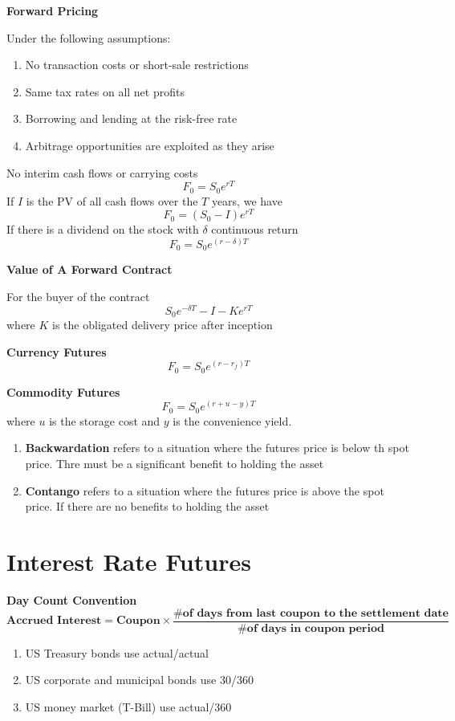 \documentclass[11pt,fleqn]{book} %
\numberwithin{equation}{section} %
\numberwithin{figure}{section} %
\numberwithin{table}{section} %
\begin{document}
\begin{theorem}\textbf{Forward Pricing}

Under the following assumptions:
\begin{enumerate}
    \item No transaction costs or short-sale restrictions
    \item Same tax rates on all net profits
    \item Borrowing and lending at the risk-free rate
    \item Arbitrage opportunities are exploited as they arise
\end{enumerate}
No interim cash flows or carrying costs
$$
F_0=S_0e^{rT}
$$
If $I$ is the PV of all cash flows over the $T$ years, we have
$$
F_0=(S_0-I)e^{rT}
$$
If there is a dividend on the stock with $\delta$ continuous return
$$
F_0=S_0e^{(r-\delta)T}
$$
\end{theorem}
\begin{theorem}\textbf{Value of A Forward Contract}

For the buyer of the contract
$$
S_0e^{-\delta T}-I-Ke^{rT}
$$
where $K$ is the obligated delivery price after inception
\end{theorem}
\begin{theorem}\textbf{Currency Futures}
$$
F_0=S_0e^{(r-r_f)T}
$$
\end{theorem}
\begin{theorem}\textbf{Commodity Futures}
$$
F_0=S_0e^{(r+u-y)T}
$$
where $u$ is the storage cost and $y$ is the convenience yield.
\end{theorem}
\begin{definition}
\begin{enumerate}
    \item \textbf{Backwardation} refers to a situation where the futures price is below th spot price. Thre must be a significant benefit to holding the asset
    \item \textbf{Contango} refers to a situation where the futures price is above the spot price. If there are no benefits to holding the asset
\end{enumerate}
\end{definition}
\chapter{Interest Rate Futures}
 \begin{definition}\textbf{Day Count Convention}\\
 $$
 \textbf{Accrued Interest}=\textbf{Coupon}\times\frac{\textbf{\# of days from last coupon to the settlement date}}{\textbf{\# of days in coupon period}}
 $$
 \begin{enumerate}
     \item US Treasury bonds use actual/actual
     \item US corporate and municipal bonds use 30/360
     \item US money market (T-Bill) use actual/360
 \end{enumerate}
 \end{definition}
 
\end{document}
